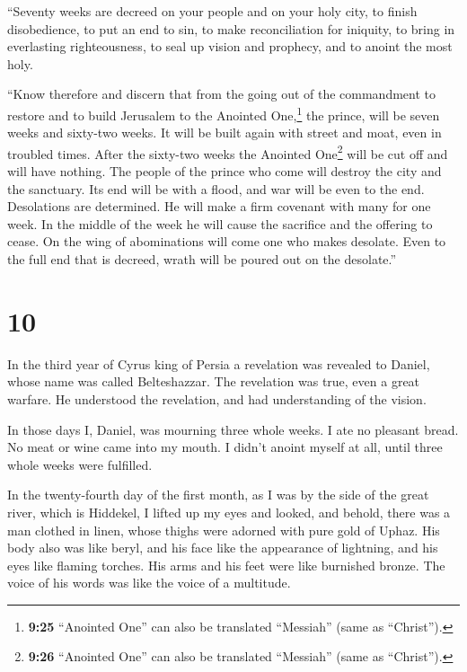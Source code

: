  ``Seventy weeks are decreed on your people and on your
holy city, to finish disobedience, to put an end to sin, to make
reconciliation for iniquity, to bring in everlasting righteousness, to
seal up vision and prophecy, and to anoint the most holy.

 ``Know therefore and discern that from the going out of
the commandment to restore and to build Jerusalem to the Anointed
One,\footnote{\textbf{9:25} ``Anointed One'' can also be translated
  ``Messiah'' (same as ``Christ'').} the prince, will be seven weeks and
sixty-two weeks. It will be built again with street and moat, even in
troubled times.  After the sixty-two weeks the Anointed
One\footnote{\textbf{9:26} ``Anointed One'' can also be translated
  ``Messiah'' (same as ``Christ'').} will be cut off and will have
nothing. The people of the prince who come will destroy the city and the
sanctuary. Its end will be with a flood, and war will be even to the
end. Desolations are determined.  He will make a firm
covenant with many for one week. In the middle of the week he will cause
the sacrifice and the offering to cease. On the wing of abominations
will come one who makes desolate. Even to the full end that is decreed,
wrath will be poured out on the desolate.''

\hypertarget{section-9}{%
\section{10}\label{section-9}}

 In the third year of Cyrus king of Persia a revelation
was revealed to Daniel, whose name was called Belteshazzar. The
revelation was true, even a great warfare. He understood the revelation,
and had understanding of the vision.

 In those days I, Daniel, was mourning three whole weeks.
 I ate no pleasant bread. No meat or wine came into my
mouth. I didn't anoint myself at all, until three whole weeks were
fulfilled.

 In the twenty-fourth day of the first month, as I was by
the side of the great river, which is Hiddekel,  I lifted
up my eyes and looked, and behold, there was a man clothed in linen,
whose thighs were adorned with pure gold of Uphaz.  His
body also was like beryl, and his face like the appearance of lightning,
and his eyes like flaming torches. His arms and his feet were like
burnished bronze. The voice of his words was like the voice of a
multitude.

